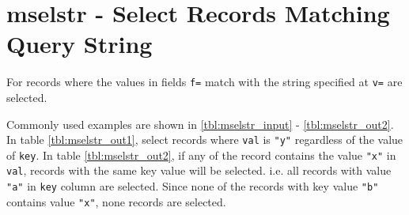 
%

\section{mselstr - Select Records Matching Query String\label{sect:mselstr}}
For records where the values in fields \verb|f=| match with the string specified at \verb|v=| are selected.

Commonly used examples are shown in \ref{tbl:mselstr_input} - \ref{tbl:mselstr_out2}. 
In table \ref{tbl:mselstr_out1}, select records where \verb|val| is \verb|"y"| regardless of the value of \verb|key|. 
In table \ref{tbl:mselstr_out2}, if any of the record contains the value \verb|"x"| in \verb|val|, records with the same key value will be selected.  i.e. all records with value \verb|"a"| in \verb|key| column are selected. Since none of the  records with key value \verb|"b"| contains value \verb|"x"|, none records are selected. 

